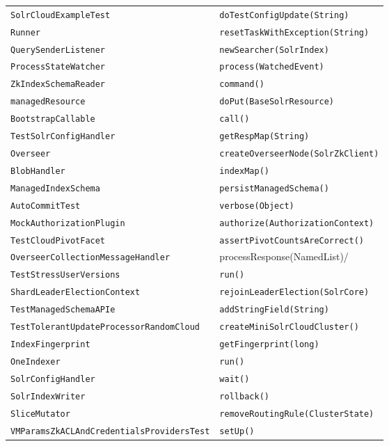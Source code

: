 \begin{center}
\begin{longtable}{ll}
\lstinline/SolrCloudExampleTest/&{\lstinline/doTestConfigUpdate(String)/}\\
\lstinline/Runner/&{\lstinline/resetTaskWithException(String)/}\\
\lstinline/QuerySenderListener/&{\lstinline/newSearcher(SolrIndex)/}\\
\lstinline/ProcessStateWatcher/&{\lstinline/process(WatchedEvent)/}\\
\lstinline/ZkIndexSchemaReader/&{\lstinline/command()/}\\
\lstinline/managedResource/&{\lstinline/doPut(BaseSolrResource)/}\\
\lstinline/BootstrapCallable/&{\lstinline/call()/}\\
\lstinline/TestSolrConfigHandler/&{\lstinline/getRespMap(String)/}\\
\lstinline/Overseer/&{\lstinline/createOverseerNode(SolrZkClient)/}\\
\lstinline/BlobHandler/&{\lstinline/indexMap()/}\\
\lstinline/ManagedIndexSchema/&{\lstinline/persistManagedSchema()/}\\
\lstinline/AutoCommitTest/&{\lstinline/verbose(Object)/}\\
\lstinline/MockAuthorizationPlugin/&{\lstinline/authorize(AuthorizationContext)/}\\
\lstinline/TestCloudPivotFacet/&{\lstinline/assertPivotCountsAreCorrect()/}\\
\lstinline/OverseerCollectionMessageHandler/&{processResponse(NamedList)/}\\
\lstinline/TestStressUserVersions/&{\lstinline/run()/}\\
\lstinline/ShardLeaderElectionContext/&{\lstinline/rejoinLeaderElection(SolrCore)/}\\
\lstinline/TestManagedSchemaAPIe/&{\lstinline/addStringField(String)/}\\
\lstinline/TestTolerantUpdateProcessorRandomCloud/&{\lstinline/createMiniSolrCloudCluster()/}\\
\lstinline/IndexFingerprint/&{\lstinline/getFingerprint(long)/}\\
\lstinline/OneIndexer/&{\lstinline/run()/}\\
\lstinline/SolrConfigHandler/&{\lstinline/wait()/}\\
\lstinline/SolrIndexWriter/&{\lstinline/rollback()/}\\
\lstinline/SliceMutator/&{\lstinline/removeRoutingRule(ClusterState)/}\\
\lstinline/VMParamsZkACLAndCredentialsProvidersTest/&{\lstinline/setUp()/}\\

\end{longtable}
\end{center}
